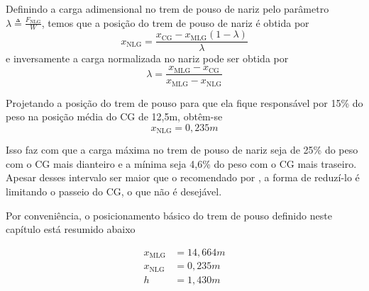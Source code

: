 Definindo a carga adimensional no trem de pouso de nariz pelo parâmetro $\lambda \triangleq \frac{F_\text{NLG}}{W}$, temos que a posição do trem de pouso de nariz é obtida por
\begin{equation}
x_\text{NLG} = \frac{x_\text{CG} - x_\text{MLG}(1-\lambda)}{\lambda}
\end{equation}
e inversamente a carga normalizada no nariz pode ser obtida por
\begin{equation}
\lambda = \frac{x_\text{MLG} - x_\text{CG}}{x_\text{MLG}-x_\text{NLG}}
\end{equation}

Projetando a posição do trem de pouso para que ela fique responsável por 15\% do peso na posição média do CG de 12,5m, obtêm-se
\begin{equation}
x_\text{NLG} = 0,235\si{m}
\end{equation}

Isso faz com que a carga máxima no trem de pouso de nariz seja de 25\% do peso com o CG mais dianteiro e a mínima seja 4,6\% do peso com o CG mais traseiro. Apesar desses intervalo ser maior que o recomendado por \cite{gudmundsson}, a forma de reduzí-lo é limitando o passeio do CG, o que não é desejável.

Por conveniência, o posicionamento básico do trem de pouso definido neste capítulo está resumido abaixo

\begin{align*}
x_\text{MLG} &= 14,664\si{m}\\
x_\text{NLG} &= 0,235\si{m}\\
h            &= 1,430 \si{m} 
\end{align*}


